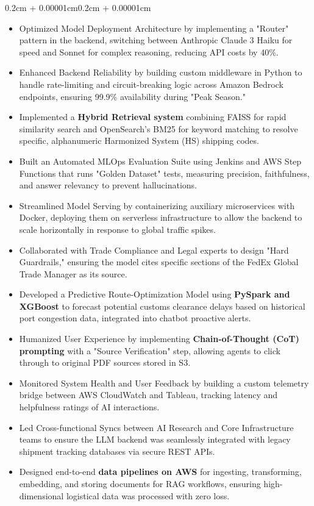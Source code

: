 \documentclass{article}
\newenvironment{highlights}{
    \begin{itemize}[
        topsep=0.10cm, 
        parsep=0.08cm, 
        partopsep=0pt, 
        itemsep=0.08cm, 
        leftmargin=0.4cm + 10pt
    ]
}{
    \end{itemize}
}
\newenvironment{onecolentry}{
    \begin{adjustwidth}{0.2cm + 0.00001cm}{0.2cm + 0.00001cm}
}{
    \end{adjustwidth}
}
\begin{document}
\begin{onecolentry}
\begin{highlights}
        \item Optimized Model Deployment Architecture by implementing a "Router" pattern in the backend, switching between Anthropic Claude 3 Haiku for speed and Sonnet for complex reasoning, reducing API costs by 40\%.
        \item Enhanced Backend Reliability by building custom middleware in Python to handle rate-limiting and circuit-breaking logic across Amazon Bedrock endpoints, ensuring 99.9\% availability during "Peak Season."
        \item Implemented a \textbf{Hybrid Retrieval system} combining FAISS for rapid similarity search and OpenSearch’s BM25 for keyword matching to resolve specific, alphanumeric Harmonized System (HS) shipping codes.
        \item Built an Automated MLOps Evaluation Suite using Jenkins and AWS Step Functions that runs "Golden Dataset" tests, measuring precision, faithfulness, and answer relevancy to prevent hallucinations.
        \item Streamlined Model Serving by containerizing auxiliary microservices with Docker, deploying them on serverless infrastructure to allow the backend to scale horizontally in response to global traffic spikes.
        \item Collaborated with Trade Compliance and Legal experts to design "Hard Guardrails," ensuring the model cites specific sections of the FedEx Global Trade Manager as its source.
        \item Developed a Predictive Route-Optimization Model using \textbf{PySpark and XGBoost} to forecast potential customs clearance delays based on historical port congestion data, integrated into chatbot proactive alerts.
        \item Humanized User Experience by implementing \textbf{Chain-of-Thought (CoT) prompting} with a "Source Verification" step, allowing agents to click through to original PDF sources stored in S3.
        \item Monitored System Health and User Feedback by building a custom telemetry bridge between AWS CloudWatch and Tableau, tracking latency and helpfulness ratings of AI interactions.
        \item Led Cross-functional Syncs between AI Research and Core Infrastructure teams to ensure the LLM backend was seamlessly integrated with legacy shipment tracking databases via secure REST APIs.
        \item Designed end-to-end \textbf{data pipelines on AWS} for ingesting, transforming, embedding, and storing documents for RAG workflows, ensuring high-dimensional logistical data was processed with zero loss.

\end{highlights}
\end{onecolentry}
\end{document}
